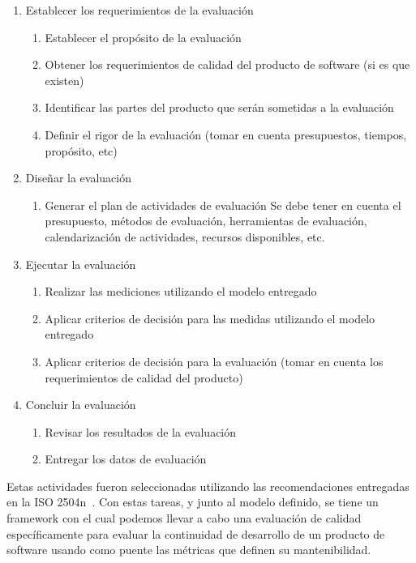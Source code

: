 \documentclass[letterpaper]{article}
\begin{document}
\begin{enumerate}
    \item Establecer los requerimientos de la evaluación
        \begin{enumerate}
                \item Establecer el propósito de la evaluación
                \item Obtener los requerimientos de calidad del producto de software (si es que existen)
                \item Identificar las partes del producto que serán sometidas a la evaluación
                \item Definir el rigor de la evaluación (tomar en cuenta presupuestos, tiempos, propósito, etc)
        \end{enumerate}
    \item Diseñar la evaluación
        \begin{enumerate}
                \item Generar el plan de actividades de evaluación
                    Se debe tener en cuenta el presupuesto, métodos de evaluación, herramientas de evaluación, 
                    calendarización de actividades, recursos disponibles, etc.
        \end{enumerate}
    \item Ejecutar la evaluación
        \begin{enumerate}
                \item Realizar las mediciones utilizando el modelo entregado
                \item Aplicar criterios de decisión para las medidas utilizando el modelo entregado
                \item Aplicar criterios de decisión para la evaluación (tomar en cuenta los requerimientos de calidad
                    del producto)
        \end{enumerate}
    \item Concluir la evaluación
        \begin{enumerate}
            \item Revisar los resultados de la evaluación
            \item Entregar los datos de evaluación
        \end{enumerate}
\end{enumerate}

Estas actividades fueron seleccionadas utilizando las recomendaciones entregadas en la ISO 2504n~\cite{25040}.
Con estas tareas, y junto al modelo definido, se tiene un framework con el cual podemos llevar a cabo
una evaluación de calidad específicamente para evaluar la continuidad de desarrollo de un producto de software
usando como puente las métricas que definen su mantenibilidad.
\end{document}

